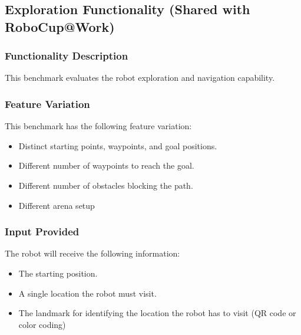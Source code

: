 
\subsection{Exploration Functionality (Shared with RoboCup@Work)}
\label{ssec:Exploration}

\subsubsection{Functionality Description}
\label{sssec:FooOMDescription}

This benchmark evaluates the robot exploration and navigation capability.

\subsubsection{Feature Variation}
\label{sssec:FooOMVariation}

This benchmark has the following feature variation:
\begin{itemize}
  \item{Distinct starting points, waypoints, and goal positions.}
  \item{Different number of waypoints to reach the goal.}
  \item{Different number of obstacles blocking the path.}
  \item{Different arena setup}
\end{itemize}

\subsubsection{Input Provided}
\label{sssec:FooOMInput}

The robot will receive the following information:
\begin{itemize}
  \item{The starting position.}
  \item{A single location the robot must visit.}
  \item{The landmark for identifying the location the robot has to visit (QR code or color coding)}
\end{itemize}

